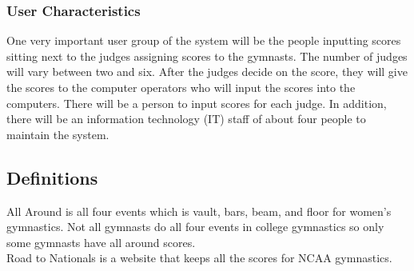 \documentclass[letterpaper,10pt,draftclsnofoot,onecolumn,]{article}
\begin{document}
\subsubsection{User Characteristics}
One very important user group of the system will be the people inputting scores sitting next to the judges assigning scores to the gymnasts. The number of judges will vary between two and six. After the judges decide on the score, they will give the scores to the computer operators who will input the scores into the computers. There will be a person to input scores for each judge. In addition, there will be an information technology (IT) staff of about four people to maintain the system.


\subsection{Definitions}
All Around is all four events which is vault, bars, beam, and floor for women's gymnastics. Not all gymnasts do all four events in college gymnastics so only some gymnasts have all around scores.\\

\noindent Road to Nationals is a website that keeps all the scores for NCAA gymnastics.
\end{document}
